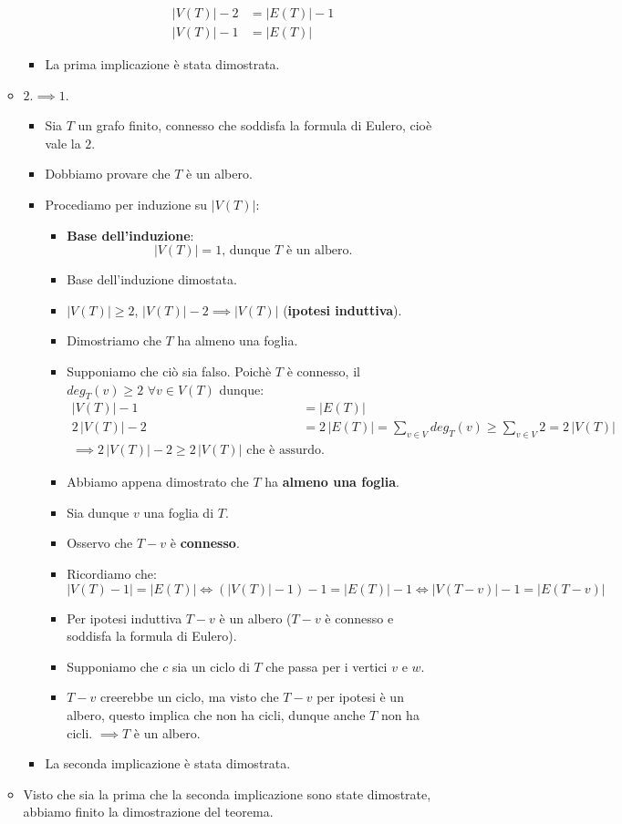 \documentclass[10pt]{article}
\begin{document}
\begin{itemize}
\begin{itemize}
\begin{itemize}
\begin{itemize}
\begin{equation}
\begin{split}
|V(T)|-2 &= |E(T)|-1 \\
|V(T)|-1 &= |E(T)|
\end{split}
\end{equation}
\end{itemize}
\item
La prima implicazione è stata dimostrata.
\end{itemize}
\item
$2. \implies 1.$
\begin{itemize}
\item
Sia $T$ un grafo finito, connesso che soddisfa la formula di Eulero, cioè vale la $2.$
\item
Dobbiamo provare che $T$ è un albero.
\item
Procediamo per induzione su $|V(T)|$:
\begin{itemize}
\item
\textbf{Base dell'induzione}: $$|V(T)| = 1 \textrm{, dunque } T \textrm{ è un albero.}$$
\item
Base dell'induzione dimostata.
\item
$|V(T)| \geq 2$, $|V(T)| - 2 \implies |V(T)|$ (\textbf{ipotesi induttiva}).
\item
Dimostriamo che $T$ ha almeno una foglia. 
\item 
Supponiamo che ciò sia falso.
Poichè $T$ è connesso, il $deg_T(v) \geq 2 \,\, \forall v \in V(T)$ dunque:
\begin{equation}
\begin{split}
|V(T)| - 1 &= |E(T)| \\
2\,|V(T)| - 2 &= 2\,|E(T)| = \sum_{v \in V} deg_T(v) \geq \sum_{v \in V} 2 = 2\,|V(T)| \\
\implies 2\,|V(T)| - 2 \geq 2\,|V(T)| \textrm{ che è assurdo.}
\end{split}
\end{equation}
\item
Abbiamo appena dimostrato che $T$ ha \textbf{almeno una foglia}.
\item
Sia dunque $v$ una foglia di $T$.
\item
Osservo che $T-v$ è \textbf{connesso}.
\item
Ricordiamo che: $$|V(T)-1| = |E(T)| \Longleftrightarrow (|V(T)|-1) - 1 = |E(T)| - 1 \Longleftrightarrow |V(T-v)|-1 = |E(T-v)|$$
\item
Per ipotesi induttiva $T-v$ è un albero ($T-v$ è connesso e soddisfa la formula di Eulero).
\item
Supponiamo che $c$ sia un ciclo di $T$ che passa per i vertici $v$ e $w$.
\item
$T-v$ creerebbe un ciclo, ma visto che $T-v$ per ipotesi è un albero, questo implica che non ha cicli, dunque anche $T$ non ha cicli.
$\implies T$ è un albero. 
\end{itemize}
\item
La seconda implicazione è stata dimostrata.
\end{itemize}
\item
Visto che sia la prima che la seconda implicazione sono state dimostrate, abbiamo finito la dimostrazione del teorema.
\end{itemize}
\end{itemize}
\end{document}
